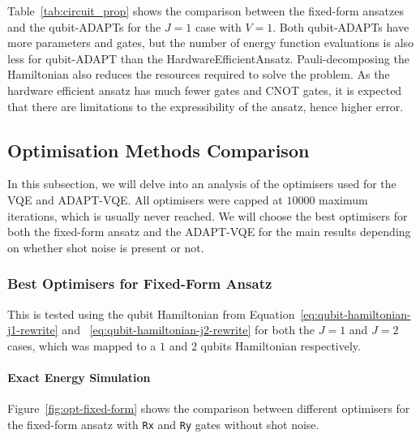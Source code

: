 Table~\ref{tab:circuit_prop} shows the comparison between the fixed-form ansatzes and the qubit-ADAPTs for the $ J=1 $ case with $ V=1 $. Both qubit-ADAPTs have more parameters and gates, but the number of energy function evaluations is also less for qubit-ADAPT than the HardwareEfficientAnsatz. Pauli-decomposing the Hamiltonian also reduces the resources required to solve the problem. As the hardware efficient ansatz has much fewer gates and CNOT gates, it is expected that there are limitations to the expressibility of the ansatz, hence higher error.

\subsection{Optimisation Methods Comparison}
\label{sub:Optimisers}
In this subsection, we will delve into an analysis of the optimisers used for the VQE and ADAPT-VQE. All optimisers were capped at $ 10000 $ maximum iterations, which is usually never reached. We will choose the best optimisers for both the fixed-form ansatz and the ADAPT-VQE for the main results depending on whether shot noise is present or not.

\subsubsection{Best Optimisers for Fixed-Form Ansatz }%
\label{ssub:BestOptimisersforHW}
This is tested using the qubit Hamiltonian from Equation~\eqref{eq:qubit-hamiltonian-j1-rewrite} and ~\eqref{eq:qubit-hamiltonian-j2-rewrite}  for both the $ J=1 $ and $ J=2 $ cases, which was mapped to a $ 1 $ and $ 2 $ qubits Hamiltonian respectively.

\paragraph{Exact Energy Simulation}
Figure~\ref{fig:opt-fixed-form} shows the comparison between different optimisers for the fixed-form ansatz with \texttt{Rx} and \texttt{Ry} gates without shot noise.

